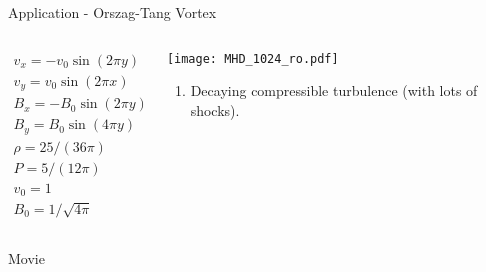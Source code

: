 \documentclass[10pt,aspectratio=169,usenames,dvipsnames]{beamer}
\begin{document}
\begin{frame}{Application - Orszag-Tang Vortex}
\begin{columns}
\begin{column}{0.4\textwidth}
\begin{gather}
    v_{x}=-v_0 \sin (2 \pi y) \\
    v_{y}= v_0 \sin (2 \pi x) \\
    B_{x}=-B_0 \sin (2 \pi y) \\
    B_{y}= B_0 \sin (4 \pi y) \\
    \rho = 25/(36 \pi) \\
    P=5/(12 \pi) \\
    v_0=1 \\
    B_0=1/\sqrt{4 \pi}
\end{gather}
\end{column}
\begin{column}{0.6\textwidth}
\texttt{[image: MHD\_1024\_ro.pdf]}
\begin{enumerate}
    \item Decaying compressible turbulence (with lots of shocks).
\end{enumerate}
\end{column}
\end{columns}
\end{frame}




\begin{frame}{Movie}
\end{frame}
\end{document}

